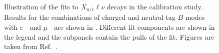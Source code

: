 \begin{figure}[htbp!]
{{        }
    }
    \caption{\label{fig:fei_calib} Illustration of the fits to \B\to$X_{u/c}\ell\nu$ decays in the \FEI calibration study.
    Results for the combinations of charged and neutral tag-$B$ modes with $e^-$ and $\mu^-$
    are shown in .
    Different fit components are shown in the legend and the subpanels contain the pulls of the fit.
    Figures are taken from Ref.~\cite{Belle-II:2020fst}.
    }
\end{figure}

